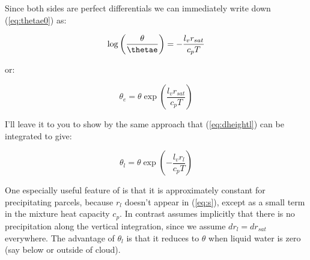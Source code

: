 \documentclass[12pt]{article}
\begin{document}
Since both sides are perfect differentials we can immediately write
down (\ref{eq:thetae0}) as:

\begin{equation}
  \label{eq:thetae1}
  \log \left ( \frac{\theta}{\thetae} \right ) = -\frac{l_v r_{sat}}{c_p T} 
\end{equation}

or:

\begin{equation}
  \label{eq:thetae2}
  \theta_e = \theta \exp \left ( \frac{l_v r_{sat}}{c_p T} \right )
\end{equation}

I'll leave it to you to show by the same approach that (\ref{eq:dheightl}) can
be integrated to give:

\begin{equation}
  \label{eq:thetal}
  \theta_l = \theta \exp \left ( - \frac{l_v r_l}{c_p T} \right )
\end{equation}

One especially useful feature of \thetae is that it is approximately
constant for precipitating parcels, because $r_l$ doesn't appear in
(\ref{eq:s}), except as a small term in the mixture heat capacity $c_p$.
In contrast \thetal assumes implicitly that there is no precipitation
along the vertical integration, since we assume $dr_l = dr_{sat}$ everywhere.
The advantage of $\theta_l$ is that it reduces to $\theta$ when
liquid water is zero (say below or outside of cloud).
\end{document}
